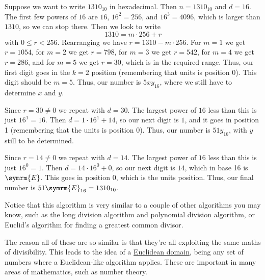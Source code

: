 \documentclass[fleqn]{LectureClass/LectureClass}
\newcommand{\hexadecimaldigit}[1]{\symrm{#1}}
\begin{document}
    \begin{exm}{}
        Suppose we want to write \(1310_{10}\) in hexadecimal.
        Then \(n = 1310_{10}\) and \(d = 16\).
        The first few powers of \(16\) are \(16\), \(16^2 = 256\), and \(16^3 = 4096\), which is larger than \(1310\), so we can stop there.
        Then we look to write
        \begin{equation}
            1310 = m \cdot 256 + r
        \end{equation}
        with \(0 \le r < 256\).
        Rearranging we have \(r = 1310 - m \cdot 256\).
        For \(m = 1\) we get \(r = 1054\), for \(m = 2\) we get \(r = 798\), for \(m = 3\) we get \(r = 542\), for \(m = 4\) we get \(r = 286\), and for \(m = 5\) we get \(r = 30\), which is in the required range.
        Thus, our first digit goes in the \(k = 2\) position (remembering that units is position \(0\)).
        This digit should be \(m = 5\).
        Thus, our number is \(5xy_{16}\), where we still have to determine \(x\) and \(y\).
        
        Since \(r = 30 \ne 0\) we repeat with \(d = 30\).
        The largest power of \(16\) less than this is just \(16^1 = 16\).
        Then \(d = 1 \cdot 16^1 + 14\), so our next digit is \(1\), and it goes in position 1 (remembering that the units is position \(0\)).
        Thus, our number is \(51y_{16}\), with \(y\) still to be determined.
        
        Since \(r = 14 \ne 0\) we repeat with \(d = 14\).
        The largest power of \(16\) less than this is just \(16^0 = 1\).
        Then \(d = 14 \cdot 16^0 + 0\), so our next digit is \(14\), which in base 16 is \(\hexadecimaldigit{E}\).
        This goes in position \(0\), which is the units position.
        Thus, our final number is \(51\hexadecimaldigit{E}_{16} = 1310_{10}\).
    \end{exm}
    
    \begin{remark}{}{}
        Notice that this algorithm is very similar to a couple of other algorithms you may know, such as the long division algorithm and polynomial division algorithm, or Euclid's algorithm for finding a greatest common divisor.
        
        The reason all of these are so similar is that they're all exploiting the same maths of divisibility.
        This leads to the idea of a \href{https://en.wikipedia.org/wiki/Euclidean_domain}{Euclidean domain}, being any set of numbers where a Euclidean-like algorithm applies.
        These are important in many areas of mathematics, such as number theory.
    \end{remark}
    
\end{document}
